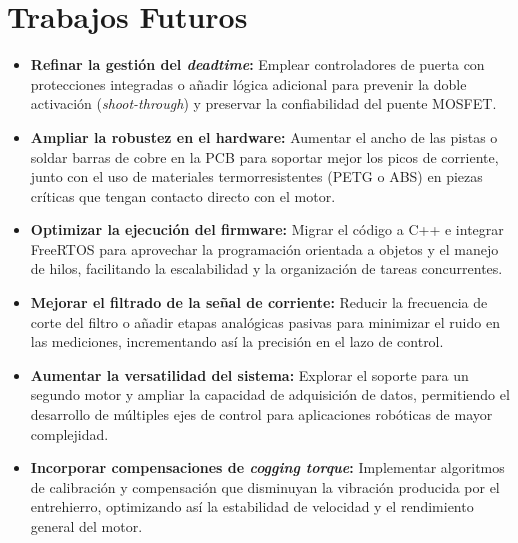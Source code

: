 \documentclass[11pt]{report}
\begin{document}
\section*{Trabajos Futuros}
\begin{itemize}
	\item \textbf{Refinar la gestión del \emph{deadtime}:} Emplear controladores de puerta con protecciones integradas o añadir lógica adicional para prevenir la doble activación (\emph{shoot-through}) y preservar la confiabilidad del puente MOSFET.

	\item \textbf{Ampliar la robustez en el hardware:} Aumentar el ancho de las pistas o soldar barras de cobre en la PCB para soportar mejor los picos de corriente, junto con el uso de materiales termorresistentes (PETG o ABS) en piezas críticas que tengan contacto directo con el motor.

	\item \textbf{Optimizar la ejecución del firmware:} Migrar el código a C++ e integrar FreeRTOS para aprovechar la programación orientada a objetos y el manejo de hilos, facilitando la escalabilidad y la organización de tareas concurrentes.

	\item \textbf{Mejorar el filtrado de la señal de corriente:} Reducir la frecuencia de corte del filtro o añadir etapas analógicas pasivas para minimizar el ruido en las mediciones, incrementando así la precisión en el lazo de control.

	\item \textbf{Aumentar la versatilidad del sistema:} Explorar el soporte para un segundo motor y ampliar la capacidad de adquisición de datos, permitiendo el desarrollo de múltiples ejes de control para aplicaciones robóticas de mayor complejidad.

	\item \textbf{Incorporar compensaciones de \emph{cogging torque}:} Implementar algoritmos de calibración y compensación que disminuyan la vibración producida por el entrehierro, optimizando así la estabilidad de velocidad y el rendimiento general del motor.
\end{itemize}

\href{https://www.youtube.com/watch?v=2yJgwwDcgV8}{\phantom{ASDF--------------------ASDF}}

\newpage
{}
\printbibliography

\end{document}

